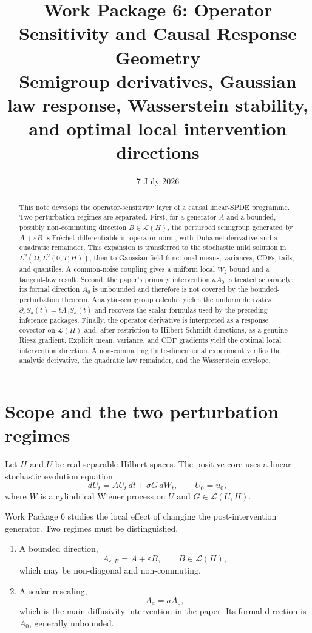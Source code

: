 \documentclass[11pt]{article}
\title{Work Package 6: Operator Sensitivity and Causal Response Geometry\\
\large Semigroup derivatives, Gaussian law response, Wasserstein stability, and optimal local intervention directions}
\author{}
\date{7 July 2026}
\theoremstyle{remark}
\newcommand{\cL}{\mathcal L}
\begin{document}
\maketitle

\begin{abstract}
This note develops the operator-sensitivity layer of a causal linear-SPDE programme. Two perturbation regimes are separated. First, for a generator $A$ and a bounded, possibly non-commuting direction $B\in\cL(H)$, the perturbed semigroup generated by $A+\varepsilon B$ is Fr\'echet differentiable in operator norm, with Duhamel derivative and a quadratic remainder. This expansion is transferred to the stochastic mild solution in $L^2(\Omega;L^2(0,T;H))$, then to Gaussian field-functional means, variances, CDFs, tails, and quantiles. A common-noise coupling gives a uniform local $W_2$ bound and a tangent-law result. Second, the paper's primary intervention $aA_0$ is treated separately: its formal direction $A_0$ is unbounded and therefore is not covered by the bounded-perturbation theorem. Analytic-semigroup calculus yields the uniform derivative $\partial_aS_a(t)=tA_0S_a(t)$ and recovers the scalar formulas used by the preceding inference packages. Finally, the operator derivative is interpreted as a response covector on $\cL(H)$ and, after restriction to Hilbert-Schmidt directions, as a genuine Riesz gradient. Explicit mean, variance, and CDF gradients yield the optimal local intervention direction. A non-commuting finite-dimensional experiment verifies the analytic derivative, the quadratic law remainder, and the Wasserstein envelope.
\end{abstract}

\section{Scope and the two perturbation regimes}

Let $H$ and $U$ be real separable Hilbert spaces. The positive core uses a linear stochastic evolution equation
\begin{equation}\label{eq:base-spde}
 dU_t=AU_t\,dt+\sigma G\,dW_t,
 \qquad U_0=u_0,
\end{equation}
where $W$ is a cylindrical Wiener process on $U$ and $G\in\cL(U,H)$.

Work Package 6 studies the local effect of changing the post-intervention generator. Two regimes must be distinguished.

\begin{enumerate}[label=(\roman*)]
\item A bounded direction,
\begin{equation}\label{eq:bounded-pert}
 A_{\varepsilon,B}=A+\varepsilon B,
 \qquad B\in\cL(H),
\end{equation}
which may be non-diagonal and non-commuting.
\item A scalar rescaling,
\begin{equation}\label{eq:scaling-pert}
 A_a=aA_0,
\end{equation}
which is the main diffusivity intervention in the paper. Its formal direction is $A_0$, generally unbounded.
\end{enumerate}
\end{document}
